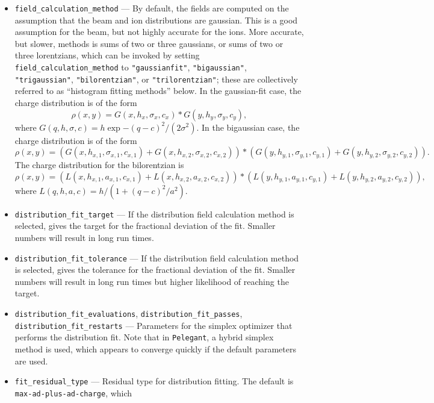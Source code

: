 \documentclass[11pt]{article}
\begin{document}
\begin{itemize}
\item \verb|field_calculation_method| --- By default, the fields are computed on the
  assumption that the beam and ion distributions are gaussian. This is a good assumption for the beam, but not highly accurate
  for the ions. More accurate, but slower, methods is sums of two or three gaussians, or sums 
  of two or three lorentzians, which can be invoked by setting
  \verb|field_calculation_method| to \verb|"gaussianfit"|, 
  \verb|"bigaussian"|, \verb|"trigaussian"|, \verb|"bilorentzian"|, or \verb|"trilorentzian"|;
  these are collectively referred to as ``histogram fitting methods'' below.
  In the gaussian-fit case, the charge distribution is of the form
  \begin{equation}
    \rho(x, y) = G(x, h_x, \sigma_x, c_x)*G(y, h_y, \sigma_y, c_y),
  \end{equation}
  where $G(q, h, \sigma, c) = h\exp{-(q-c)^2/(2\sigma^2)}$.
  In the bigaussian case, the charge distribution is of the form
  \begin{equation}
    \rho(x, y) = (G(x, h_{x,1}, \sigma_{x,1}, c_{x,1}) + G(x, h_{x,2}, \sigma_{x,2}, c_{x,2}))*
    (G(y, h_{y,1}, \sigma_{y,1}, c_{y,1}) + G(y, h_{y,2}, \sigma_{y,2}, c_{y,2})).
  \end{equation}
  The charge distribution for the bilorentzian is
  \begin{equation}
    \rho(x, y) = (L(x, h_{x,1}, a_{x,1}, c_{x,1}) + L(x, h_{x,2}, a_{x,2}, c_{x,2}))*
    (L(y, h_{y,1}, a_{y,1}, c_{y,1}) + L(y, h_{y,2}, a_{y,2}, c_{y,2})),
  \end{equation}
  where $L(q, h, a, c) = h/(1 + (q-c)^2/a^2)$.
\item \verb|distribution_fit_target| --- If the distribution field calculation method is selected, gives the target for the
  fractional deviation of the fit. Smaller numbers will result in long run times.
\item \verb|distribution_fit_tolerance| --- If the distribution field calculation method is selected, gives the tolerance for the
  fractional deviation of the fit. Smaller numbers will result in long run times but higher likelihood of reaching the target.
\item \verb|distribution_fit_evaluations|, \verb|distribution_fit_passes|, \verb|distribution_fit_restarts| --- Parameters
  for the simplex optimizer that performs the distribution fit. Note that in \verb|Pelegant|, a hybrid simplex method is
  used, which appears to converge quickly if the default parameters are used.
\item \verb|fit_residual_type| --- Residual type for distribution fitting. The default is \verb|max-ad-plus-ad-charge|, which

\end{itemize}
\end{document}
